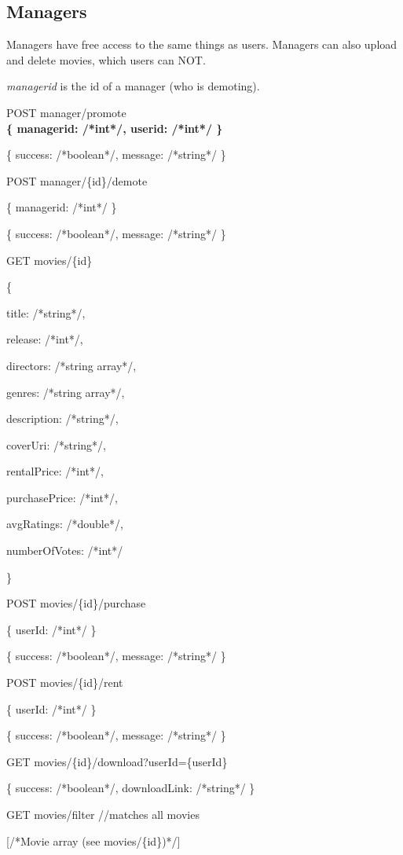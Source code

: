 \subsection{Managers}

Managers have free access to the same things as users. Managers can also upload and delete movies, which users can NOT.

\emph{managerid} is the id of a manager (who is demoting).

POST manager/promote\\
\textbf{\{ managerid: /*int*/, userid: /*int*/ \}}

    \{ success: /*boolean*/, message: /*string*/ \}

POST manager/\{id\}/demote

    \{ managerid: /*int*/ \}

    \{ success: /*boolean*/, message: /*string*/ \}

GET  movies/\{id\}

    \{

        title: /*string*/,

        release: /*int*/,

        directors: /*string array*/,

        genres: /*string array*/,

        description: /*string*/,

        coverUri: /*string*/,

        rentalPrice: /*int*/,

        purchasePrice: /*int*/,

        avgRatings: /*double*/,

        numberOfVotes: /*int*/

       \}

POST movies/\{id\}/purchase

    \{ userId: /*int*/ \}

    \{ success: /*boolean*/, message: /*string*/ \}

POST movies/\{id\}/rent

    \{ userId: /*int*/ \}

    \{ success: /*boolean*/, message: /*string*/ \}

GET  movies/\{id\}/download?userId=\{userId\}

    \{ success: /*boolean*/, downloadLink: /*string*/ \}

GET  movies/filter                     //matches all movies

    [/*Movie array (see movies/\{id\})*/]

